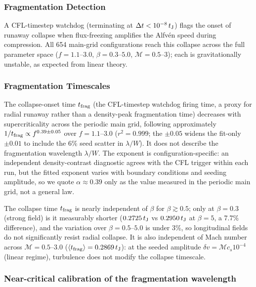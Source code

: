 \documentclass[usenatbib,twoside,twocolumn]{mnras}
\begin{document}
\subsubsection{Fragmentation Detection}

A CFL-timestep watchdog (terminating at $\Delta t<10^{-8}\,t_{\rm J}$) flags the onset of runaway collapse when flux-freezing amplifies the Alfv\'en speed during compression. All 654 main-grid configurations reach this collapse across the full parameter space ($f=1.1$--$3.0$, $\beta=0.3$--$5.0$, $\mathcal{M}=0.5$--$3$); each is gravitationally unstable, as expected from linear theory.

\subsubsection{Fragmentation Timescales}

The collapse-onset time $t_{\rm frag}$ (the CFL-timestep watchdog firing time, a proxy for radial runaway rather than a density-peak fragmentation time) decreases with supercriticality across the periodic main grid, following approximately $1/t_{\rm frag}\propto f^{0.39\pm0.05}$ over $f=1.1$--$3.0$ ($r^2=0.999$; the $\pm0.05$ widens the fit-only $\pm0.01$ to include the 6\% seed scatter in $\lambda/W$). It does not describe the fragmentation wavelength $\lambda/W$. The exponent is configuration-specific: an independent density-contrast diagnostic agrees with the CFL trigger within each run, but the fitted exponent varies with boundary conditions and seeding amplitude, so we quote $\alpha\approx0.39$ only as the value measured in the periodic main grid, not a general law.


The collapse time $t_{\rm frag}$ is nearly independent of $\beta$ for $\beta \gtrsim 0.5$; only at $\beta = 0.3$ (strong field) is it measurably shorter ($0.2725\,t_{\rm J}$ vs $0.2950\,t_{\rm J}$ at $\beta = 5$, a 7.7\% difference), and the variation over $\beta = 0.5$--$5.0$ is under 3\%, so longitudinal fields do not significantly resist radial collapse. It is also independent of Mach number across $\mathcal{M}=0.5$--$3.0$ ($\langle t_{\rm frag}\rangle=0.2869\,t_{\rm J}$): at the seeded amplitude $\delta v=\mathcal{M}c_s10^{-4}$ (linear regime), turbulence does not modify the collapse timescale.




\subsubsection{Near-critical calibration of the fragmentation wavelength}
\end{document}
